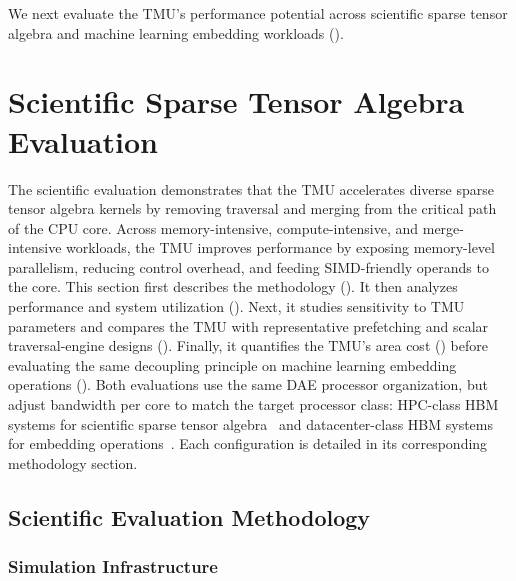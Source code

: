 We next evaluate the TMU's performance potential across scientific sparse tensor algebra and machine learning embedding workloads ().

\section{Scientific Sparse Tensor Algebra Evaluation} \label{sec:tmu-scientific-evaluation} %
The scientific evaluation demonstrates that the TMU accelerates diverse sparse tensor algebra kernels by removing traversal and merging from the critical path of the CPU core. Across memory-intensive, compute-intensive, and merge-intensive workloads, the TMU improves performance by exposing memory-level parallelism, reducing control overhead, and feeding SIMD-friendly operands to the core. This section first describes the methodology (). It then analyzes performance and system utilization (). Next, it studies sensitivity to TMU parameters and compares the TMU with representative prefetching and scalar traversal-engine designs (). Finally, it quantifies the TMU's area cost () before evaluating the same decoupling principle on machine learning embedding operations (). Both evaluations use the same DAE processor organization, but adjust bandwidth per core to match the target processor class: HPC-class HBM systems for scientific sparse tensor algebra~\cite{sato2020design} and datacenter-class HBM systems for embedding operations~\cite{reguly2023xeonmax}. Each configuration is detailed in its corresponding methodology section.

\subsection{Scientific Evaluation Methodology} \label{sec:tmu-scientific-methodology} %

\subsubsection{Simulation Infrastructure} \label{sec:tmu-simulation-infrastructure} %

